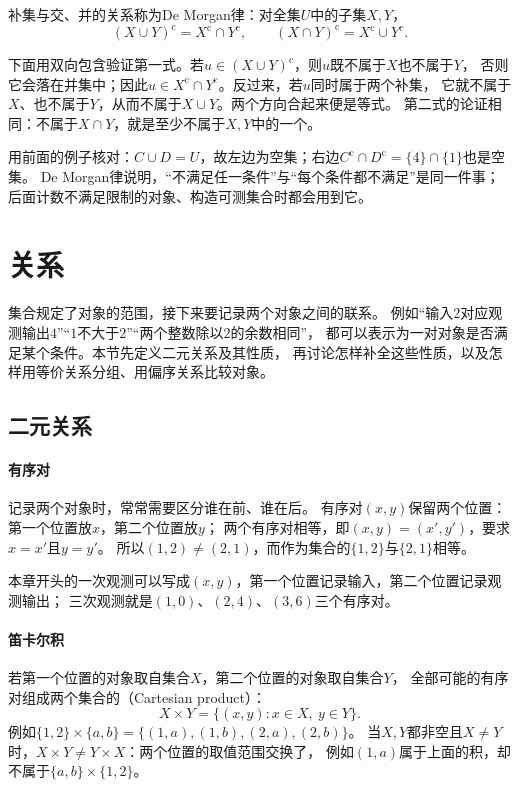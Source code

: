 补集与交、并的关系称为De Morgan律：对全集$U$中的子集$X,Y$，
\begin{equation}
 (X\cup Y)^{\mathrm c}=X^{\mathrm c}\cap Y^{\mathrm c},\qquad
 (X\cap Y)^{\mathrm c}=X^{\mathrm c}\cup Y^{\mathrm c}.
 \label{eq:prelim-de-morgan-two-sets}
\end{equation}

下面用双向包含验证第一式。若$u\in(X\cup Y)^{\mathrm c}$，则$u$既不属于$X$也不属于$Y$，
否则它会落在并集中；因此$u\in X^{\mathrm c}\cap Y^{\mathrm c}$。反过来，若$u$同时属于两个补集，
它就不属于$X$、也不属于$Y$，从而不属于$X\cup Y$。两个方向合起来便是等式。
第二式的论证相同：不属于$X\cap Y$，就是至少不属于$X,Y$中的一个。

用前面的例子核对：$C\cup D=U$，故左边为空集；右边$C^{\mathrm c}\cap D^{\mathrm c}=\{4\}\cap\{1\}$也是空集。
De Morgan律说明，“不满足任一条件”与“每个条件都不满足”是同一件事；
后面计数不满足限制的对象、构造可测集合时都会用到它。

\section{关系}
\label{sec:prelim-binary-relations}

集合规定了对象的范围，接下来要记录两个对象之间的联系。
例如“输入$2$对应观测输出$4$”“$1$不大于$2$”“两个整数除以$2$的余数相同”，
都可以表示为一对对象是否满足某个条件。本节先定义二元关系及其性质，
再讨论怎样补全这些性质，以及怎样用等价关系分组、用偏序关系比较对象。

\subsection{二元关系}
\label{sec:prelim-binary-relation-definition}

\paragraph{有序对}
记录两个对象时，常常需要区分谁在前、谁在后。
有序对$(x,y)$保留两个位置：第一个位置放$x$，第二个位置放$y$；
两个有序对相等，即$(x,y)=(x',y')$，要求$x=x'$且$y=y'$。
所以$(1,2)\neq(2,1)$，而作为集合的$\{1,2\}$与$\{2,1\}$相等。

本章开头的一次观测可以写成$(x,y)$，第一个位置记录输入，第二个位置记录观测输出；
三次观测就是$(1,0)$、$(2,4)$、$(3,6)$三个有序对。

\paragraph{笛卡尔积}
若第一个位置的对象取自集合$X$，第二个位置的对象取自集合$Y$，
全部可能的有序对组成两个集合的（Cartesian product）：
\[
 X\times Y=\{(x,y):x\in X,\ y\in Y\}.
\]
例如$\{1,2\}\times\{a,b\}=\{(1,a),(1,b),(2,a),(2,b)\}$。
当$X,Y$都非空且$X\neq Y$时，$X\times Y\neq Y\times X$：两个位置的取值范围交换了，
例如$(1,a)$属于上面的积，却不属于$\{a,b\}\times\{1,2\}$。

